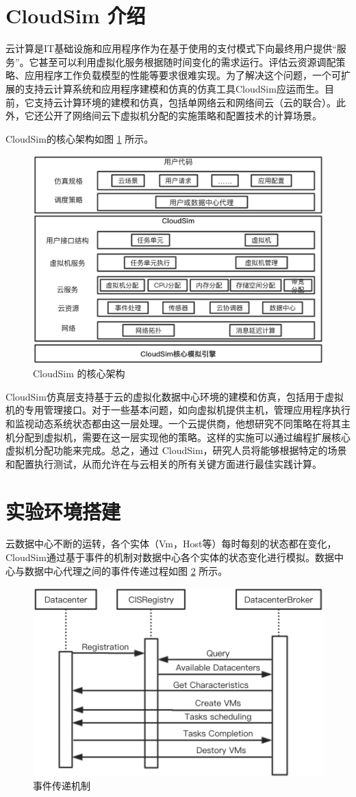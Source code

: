 \section{CloudSim 介绍}
云计算是IT基础设施和应用程序作为在基于使用的支付模式下向最终用户提供“服务”。它甚至可以利用虚拟化服务根据随时间变化的需求运行。评估云资源调配策略、应用程序工作负载模型的性能等要求很难实现。为了解决这个问题，一个可扩展的支持云计算系统和应用程序建模和仿真的仿真工具CloudSim应运而生\cite{Atanasov}。目前，它支持云计算环境的建模和仿真，包括单网络云和网络间云（云的联合）。此外，它还公开了网络间云下虚拟机分配的实施策略和配置技术的计算场景。

CloudSim的核心架构如图 \ref{Fig:chap4_1} 所示。

\begin{figure}[htb]
  \centering
  \includegraphics[width=0.6\linewidth]{./Figure/IMG_Chap4_1.png}
  \caption{CloudSim 的核心架构}\label{Fig:chap4_1}
\end{figure}

 CloudSim仿真层支持基于云的虚拟化数据中心环境的建模和仿真，包括用于虚拟机的专用管理接口。对于一些基本问题，如向虚拟机提供主机，管理应用程序执行和监视动态系统状态都由这一层处理。一个云提供商，他想研究不同策略在将其主机分配到虚拟机，需要在这一层实现他的策略。这样的实施可以通过编程扩展核心虚拟机分配功能来完成。总之，通过 CloudSim，研究人员将能够根据特定的场景和配置执行测试，从而允许在与云相关的所有关键方面进行最佳实践计算。

 \section{实验环境搭建}
云数据中心不断的运转，各个实体（Vm，Host等）每时每刻的状态都在变化，CloudSim通过基于事件的机制对数据中心各个实体的状态变化进行模拟。数据中心与数据中心代理之间的事件传递过程如图 \ref{Fig:chap4_2} 所示。

\begin{figure}[htb]
  \centering
  \includegraphics[width=0.6\linewidth]{./Figure/IMG_Chap4_2.png}
  \caption{事件传递机制}\label{Fig:chap4_2}
\end{figure}

